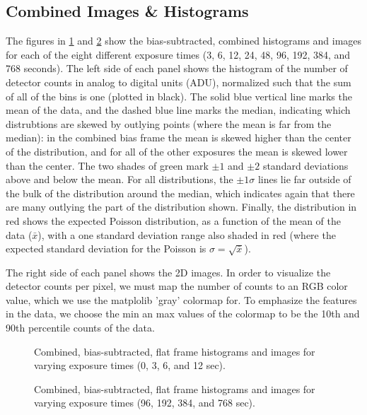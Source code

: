 \documentclass[preprint]{aastex62}
\begin{document}
\subsection{Combined Images \& Histograms}
The figures in \ref{fig:flats1} and \ref{fig:flats2} show the bias-subtracted, combined histograms and images for each of the eight different exposure times (3, 6, 12, 24, 48, 96, 192, 384, and 768 seconds). The left side of each panel shows the histogram of the number of detector counts in analog to digital units (ADU), normalized such that the sum of all of the bins is one (plotted in black). The solid blue vertical line marks the mean of the data, and the dashed blue line marks the median, indicating which distrubtions are skewed by outlying points (where the mean is far from the median): in the combined bias frame the mean is skewed higher than the center of the distribution, and for all of the other exposures the mean is skewed lower than the center. The two shades of green mark $\pm1$ and $\pm2$ standard deviations above and below the mean. For all distributions, the $\pm1\sigma$ lines lie far outside of the bulk of the distribution around the median, which indicates again that there are many outlying the part of the distribution shown. Finally, the distribution in red shows the expected Poisson distribution, as a function of the mean of the data ($\bar{x}$), with a one standard deviation range also shaded in red (where the expected standard deviation for the Poisson is $\sigma=\sqrt{\bar{x}}$).  

The right side of each panel shows the 2D images. In order to visualize the detector counts per pixel, we must map the number of counts to an RGB color value, which we use the matplolib 'gray' colormap for. To emphasize the features in the data, we choose the min an max values of the colormap to be the 10th and 90th percentile counts of the data.


\begin{figure}[ht]
\caption{Combined, bias-subtracted, flat frame histograms and images for varying exposure times (0, 3, 6, and 12 sec). \label{fig:flats1}}
\end{figure}
\begin{figure}[ht]
\caption{Combined, bias-subtracted, flat frame histograms and images for varying exposure times (96, 192, 384, and 768 sec). \label{fig:flats2}}
\end{figure}
\end{document}
